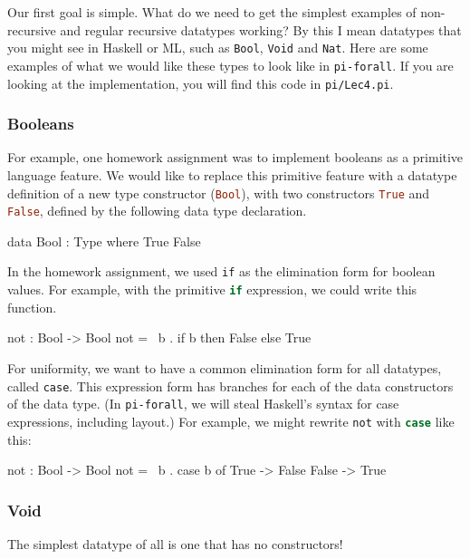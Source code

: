 \documentclass{article}
\newcommand\cd[1]{\lstinline[language=Haskell]{#1}}
\newcommand\pif{\texttt{pi-forall}\xspace}
\theoremstyle{definition}
\begin{document}
Our first goal is simple. What do we need to get the simplest examples of
non-recursive and regular recursive datatypes working? By this I mean
datatypes that you might see in Haskell or ML, such as \texttt{Bool},
\texttt{Void} and \texttt{Nat}. Here are some examples of what we would
like these types to look like in \pif. If you are looking at the implementation,
you will find this code in \texttt{pi/Lec4.pi}.

\subsubsection{Booleans}\label{booleans}

For example, one homework assignment was to implement booleans as a primitive
language feature. We would like to replace this primitive feature with a datatype
definition of a new type constructor (\cd{Bool}), with two constructors
\cd{True} and \cd{False}, defined by the following data type declaration.

\begin{piforall}
  data Bool : Type where
     True
     False
\end{piforall}

In the homework assignment, we used \texttt{if} as the elimination form
for boolean values. For example, with the primitive \cd{if} expression,
we could write this function.

\begin{piforall}
 not : Bool -> Bool
 not = \ b . if b then False else True
\end{piforall}

For uniformity, we want to have a common elimination form for all datatypes,
called \texttt{case}. This expression form has branches for each of the data
constructors of the data type. (In \pif, we will steal Haskell's syntax for case
expressions, including layout.) For example, we might rewrite \texttt{not}
with \cd{case} like this:

\begin{piforall}
not : Bool -> Bool
not = \ b .
  case b of
       True -> False
       False -> True
\end{piforall}

\subsubsection{Void}\label{void}

The simplest datatype of all is one that has no constructors!
\end{document}
